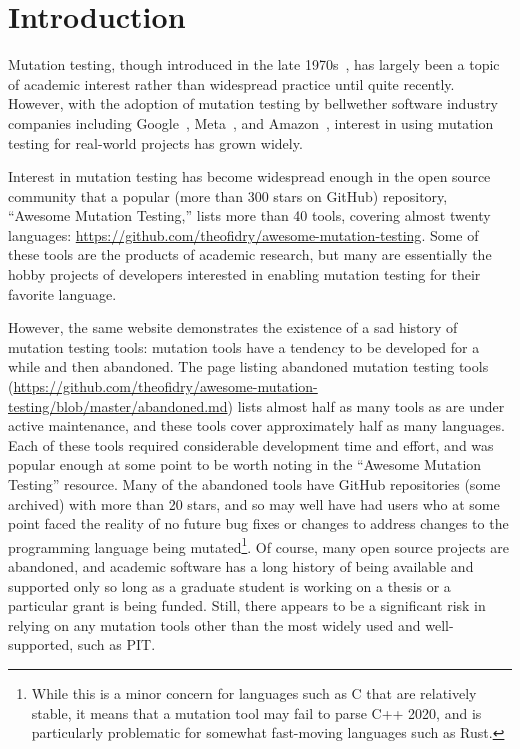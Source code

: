\documentclass[sigconf,review, anonymous]{acmart}
\begin{document}
\section{Introduction}

Mutation testing, though introduced in the late
1970s~\cite{demillo1978hints,mathur2012foundations,demillo1978hints},
has largely been a topic of academic interest rather than widespread
practice until quite recently.  However, with the adoption of mutation
testing by bellwether software industry companies including
Google~\cite{GoogleMut}, Meta~\cite{BellerFacebookMutation}, and
Amazon~\cite{AmazonMut}, interest in using mutation testing for
real-world projects has grown widely.

Interest in mutation testing has become widespread enough in the open
source community that a popular (more than 300 stars on GitHub)
repository, ``Awesome Mutation Testing,'' lists more than 40 tools,
covering almost twenty languages:
\url{https://github.com/theofidry/awesome-mutation-testing}.  Some of
these tools are the products of academic research, but many are
essentially the hobby projects of developers interested in enabling
mutation testing for their favorite language.

However, the same website demonstrates the existence of a sad history
of mutation testing tools: mutation tools have a tendency to be
developed for a while and then abandoned.   The page listing abandoned
mutation testing tools
(\url{https://github.com/theofidry/awesome-mutation-testing/blob/master/abandoned.md})
lists almost half as many tools as are under active maintenance, and
these tools cover approximately half as many languages.  Each of these
tools required considerable development time and effort, and was
popular enough at some point to be worth noting in the ``Awesome
Mutation Testing'' resource.  Many of the abandoned tools have GitHub
repositories (some archived) with more than 20 stars, and so may well
have had users who at some point faced the reality of no future bug
fixes or changes to address changes to the programming language being
mutated\footnote{While this is a minor concern for languages such as C
  that are relatively stable, it means that a mutation tool may fail
  to parse C++ 2020, and is particularly problematic for somewhat
  fast-moving languages such as Rust.}.  Of course, many open source
projects are abandoned, and academic software has a long history of
being available and supported only so long as a graduate student is
working on a thesis or a particular grant is being funded.  Still,
there appears to be a significant risk in relying on any mutation tools other
than the most widely used and well-supported, such as PIT.
\end{document}
